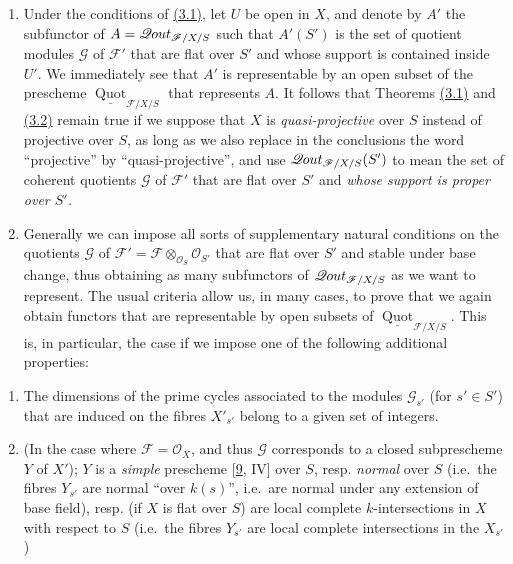 \documentclass{article}
\providecommand{\tightlist}{%
  \setlength{\itemsep}{0pt}\setlength{\parskip}{0pt}}
\newcommand{\oldpage}[1]{\marginpar{\footnotesize$\Big\vert$ \textit{p.~#1}}}
\theoremstyle{definition}
\theoremstyle{definition}
\theoremstyle{definition}
\theoremstyle{definition}
\theoremstyle{remark}
\begin{document}
\begin{enumerate}
\def\labelenumi{\alph{enumi}.}
\item
  Under the conditions of \protect\hyperlink{fga-3-iv-theorem-3.1}{(3.1)}, let \(U\) be open in \(X\), and denote by \(A'\) the subfunctor of \(A=\mathscr{Q}\kern -.5pt out_{{{\mathscr{F}}/X/S}}\) such that \(A'(S')\) is the set of quotient modules \({\mathscr{G}}\) of \({\mathscr{F}}'\) that are flat over \(S'\) and whose support is contained inside \(U'\).
  We immediately see that \(A'\) is representable by an open subset of the prescheme \(\underline{\operatorname{Quot}}_{{{\mathscr{F}}/X/S}}\) that represents \(A\).
  \oldpage{221-19}It follows that Theorems \protect\hyperlink{fga-3-iv-theorem-3.1}{(3.1)} and \protect\hyperlink{fga-3-iv-theorem-3.2}{(3.2)} remain true if we suppose that \(X\) is \emph{quasi-projective} over \(S\) instead of projective over \(S\), as long as we also replace in the conclusions the word ``projective'' by ``quasi-projective'', and use \(\mathscr{Q}\kern -.5pt out_{{{\mathscr{F}}/X/S}}(S')\) to mean the set of coherent quotients \({\mathscr{G}}\) of \({\mathscr{F}}'\) that are flat over \(S'\) and \emph{whose support is proper over \(S'\).}
\item
  Generally we can impose all sorts of supplementary natural conditions on the quotients \({\mathscr{G}}\) of \({\mathscr{F}}'={\mathscr{F}}\otimes_{{\mathscr{O}}_S}{\mathscr{O}}_{S'}\) that are flat over \(S'\) and stable under base change, thus obtaining as many subfunctors of \(\mathscr{Q}\kern -.5pt out_{{{\mathscr{F}}/X/S}}\) as we want to represent.
  The usual criteria allow us, in many cases, to prove that we again obtain functors that are representable by open subsets of \(\underline{\operatorname{Quot}}_{{{\mathscr{F}}/X/S}}\).
  This is, in particular, the case if we impose one of the following additional properties:
\end{enumerate}

\begin{enumerate}
\def\labelenumi{\arabic{enumi}.}
\tightlist
\item
  The dimensions of the prime cycles associated to the modules \({\mathscr{G}}_{s'}\) (for \(s'\in S'\)) that are induced on the fibres \(X'_{s'}\) belong to a given set of integers.
\item
  (In the case where \({\mathscr{F}}={\mathscr{O}}_X\), and thus \({\mathscr{G}}\) corresponds to a closed subprescheme \(Y\) of \(X'\)); \(Y\) is a \emph{simple} prescheme {[}\protect\hyperlink{ref-Gro1960b}{9}, IV{]} over \(S\), resp. \emph{normal} over \(S\) (i.e.~the fibres \(Y_{s'}\) are normal ``over \(k(s)\)'', i.e.~are normal under any extension of base field), resp. (if \(X\) is flat over \(S\)) are local complete \(k\)-intersections in \(X\) with respect to \(S\) (i.e.~the fibres \(Y_{s'}\) are local complete intersections in the \(X_{s'}\))
\end{enumerate}
\end{document}

